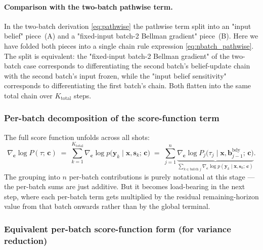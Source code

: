 \documentclass[11pt,a4paper]{article}
\newcommand{\bc}{\bm{c}}
\newcommand{\bx}{\bm{x}}
\newcommand{\by}{\bm{y}}
\newcommand{\bs}{\bm{s}}
\newcommand{\bb}{\bm{b}}
\begin{document}
\paragraph{Comparison with the two-batch pathwise term.}  In the two-batch derivation
\eqref{eq:pathwise} the pathwise term split into an "input belief" piece~(A) and a
"fixed-input batch-2 Bellman gradient" piece~(B).  Here we have folded both pieces into
a single chain rule expression \eqref{eq:nbatch_pathwise}.  The split is equivalent: the
"fixed-input batch-2 Bellman gradient" of the two-batch case corresponds to differentiating
the second batch's belief-update chain with the second batch's input frozen, while the
"input belief sensitivity" corresponds to differentiating the first batch's chain.  Both
flatten into the same total chain over $K_\mathrm{total}$ steps.

\subsubsection{Per-batch decomposition of the score-function term}
\label{sec:nbatch_score}

The full score function unfolds across all shots:
\begin{equation}
\nabla_{\bc} \log P(\tau;\, \bc)
\;=\;
\sum_{k=1}^{K_\mathrm{total}} \nabla_{\bc} \log p\bigl(\by_k \mid \bx, \bs_k;\, \bc\bigr)
\;=\;
\sum_{j=1}^{n} \underbrace{\nabla_{\bc} \log P_j\bigl(\tau_j \mid \bx, \bb^{\mathrm{bdy}}_{j-1};\, \bc\bigr)}_{\sum_{k \in \text{batch } j} \nabla_{\bc} \log p(\by_k \mid \bx, \bs_k;\, \bc)}.
\label{eq:nbatch_score_decomp}
\end{equation}
The grouping into $n$ per-batch contributions is purely notational at this stage — the
per-batch sums are just additive.  But it becomes load-bearing in the next step, where
each per-batch term gets multiplied by the residual remaining-horizon value from that
batch onwards rather than by the global terminal.

\subsubsection{Equivalent per-batch score-function form (for variance reduction)}
\label{sec:nbatch_perbatch}
\end{document}
